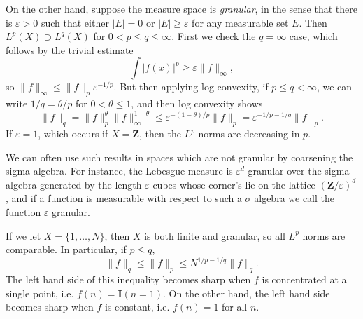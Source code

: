 \begin{example}
  On the other hand, suppose the measure space is {\it granular}, in the sense that there is $\varepsilon > 0$ such that either $|E| = 0$ or $|E| \geq \varepsilon$ for any measurable set $E$. Then $L^p(X) \supset L^q(X)$ for $0 < p \leq q \leq \infty$. First we check the $q = \infty$ case, which follows by the trivial estimate
  \[ \int |f(x)|^p \geq \varepsilon \| f \|_\infty, \]
  so $\| f \|_\infty \leq \| f \|_p \varepsilon^{-1/p}$. But then applying log convexity, if $p \leq q < \infty$, we can write $1/q = \theta/p$ for $0 < \theta \leq 1$, and then log convexity shows
  \[ \| f \|_q = \| f \|_p^\theta \| f \|_\infty^{1-\theta} \leq \varepsilon^{-(1 - \theta)/p} \| f \|_p = \varepsilon^{-1/p - 1/q} \| f \|_p. \]
  If $\varepsilon = 1$, which occurs if $X = \mathbf{Z}$, then the $L^p$ norms are decreasing in $p$.
\end{example}

  

\begin{remark}
  We can often use such results in spaces which are not granular by coarsening the sigma algebra. For instance, the Lebesgue measure is $\varepsilon^d$ granular over the sigma algebra generated by the length $\varepsilon$ cubes whose corner's lie on the lattice $(\mathbf{Z}/\varepsilon)^d$, and if a function is measurable with respect to such a $\sigma$ algebra we call the function $\varepsilon$ granular.
\end{remark}

\begin{remark}
  If we let $X = \{ 1, \dots, N \}$, then $X$ is both finite and granular, so all $L^p$ norms are comparable. In particular, if $p \leq q$,
  \[ \| f \|_q \leq \| f \|_p \leq N^{1/p - 1/q} \| f \|_q. \]
  The left hand side of this inequality becomes sharp when $f$ is concentrated at a single point, i.e. $f(n) = \mathbf{I}(n = 1)$. On the other hand, the left hand side becomes sharp when $f$ is constant, i.e. $f(n) = 1$ for all $n$.
\end{remark}

